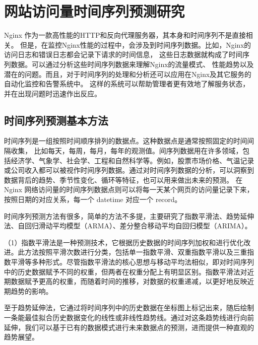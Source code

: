 \chapter{网站访问量时间序列预测研究}

Nginx 作为一款高性能的HTTP和反向代理服务器，其本身和时间序列不是直接相关。
但是，在监控Nginx性能的过程中，会涉及到时间序列数据。比如，Nginx的访问日志和错误日志都会记录下请求的时间信息，
这些日志数据就构成了时间序列数据。可以通过分析这些时间序列数据来理解Nginx的流量模式、
性能趋势以及潜在的问题。而且，对于时间序列的处理和分析还可以应用在Nginx及其它服务的自动化监控和告警系统中。
这样的系统可以帮助管理者更有效地了解服务状态，并在出现问题时迅速作出反应。

\section{时间序列预测基本方法}

时间序列是一组按照时间顺序排列的数据点。这种数据点是通常按照固定的时间间隔收集，
比如每天，每周，每月，每年的观测值。间序列数据用在许多领域，包括经济学、气象学、社会学、工程和自然科学等。例如，股票市场价格、气温记录或公司收入都可以被视作时间序列数据。通过对时间序列数据的分析，可以洞察到数据背后的趋势、季节性变化、循环等特征，也可以用来做出未来的预测。
在 Nginx 网络访问量的时间序列数据点则可以将每一天某个网页的访问量记录下来，按照日期的对应关系，每一个 datetime 对应一个 record。

时间序列预测方法有很多，简单的方法不多提，主要研究了指数平滑法、趋势延伸法、自回归滑动平均模型（ARMA）、差分整合移动平均自回归模型（ARIMA）。

（1）指数平滑法是一种预测技术，它根据历史数据的时间序列加权和进行优化改进。此方法按照平滑次数进行分类，包括单一指数平滑、双重指数平滑以及三重指数平滑等多种形式。尽管指数平滑法的核心思想与移动平均法相似，即对时间序列中的历史数据赋予不同的权重，但两者在权重分配上有明显区别。指数平滑法对近期数据赋予更高的权重，而随着时间的推移，对数据的权重递减，以更好地反映近期趋势的影响。

至于趋势延伸法，它通过将时间序列中的历史数据在坐标图上标记出来，随后绘制一条能最佳拟合历史数据变化的线性或非线性趋势线。通过对这条趋势线进行向前延伸，我们可以基于已有的数据模式进行未来数据点的预测，进而提供一种直观的趋势展望。


